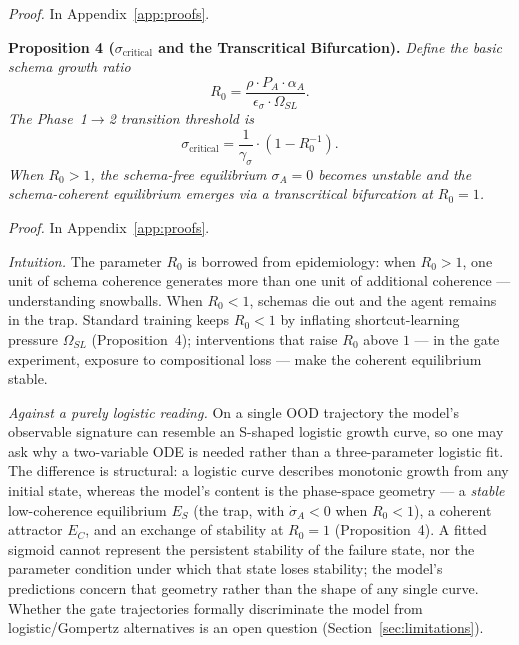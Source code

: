 \documentclass{article}
\theoremstyle{definition}
\begin{document}
\emph{Proof.} In Appendix~\ref{app:proofs}.

\textbf{Proposition 4 ($\sigma_{\text{critical}}$ and the Transcritical
Bifurcation).}
\emph{Define the basic schema growth ratio
\begin{equation}
R_0 = \frac{\rho \cdot P_A \cdot \alpha_A}{\epsilon_\sigma \cdot \Omega_{SL}}.
\end{equation}
The Phase~1$\to$2 transition threshold is
\begin{equation}\label{eq:sigma-critical}
\sigma_{\text{critical}} = \frac{1}{\gamma_\sigma} \cdot \left(1 - R_0^{-1}\right).
\end{equation}
When $R_0 > 1$, the schema-free equilibrium $\sigma_A = 0$ becomes
unstable and the schema-coherent equilibrium emerges via a
\emph{transcritical} bifurcation at $R_0 = 1$.}

\emph{Proof.} In Appendix~\ref{app:proofs}.

\noindent\emph{Intuition.} The parameter $R_0$ is borrowed from
epidemiology: when $R_0 > 1$, one unit of schema coherence generates more
than one unit of additional coherence --- understanding snowballs. When
$R_0 < 1$, schemas die out and the agent remains in the trap. Standard
training keeps $R_0 < 1$ by inflating shortcut-learning pressure
$\Omega_{SL}$ (Proposition~4); interventions
that raise $R_0$ above $1$ --- in the gate experiment, exposure to
compositional loss --- make the coherent equilibrium stable.

\noindent\emph{Against a purely logistic reading.} On a single OOD
trajectory the model's observable signature can resemble an S-shaped
logistic growth curve, so one may ask why a two-variable ODE is needed
rather than a three-parameter logistic fit. The difference is
structural: a logistic curve describes monotonic growth from any
initial state, whereas the model's content is the phase-space geometry
--- a \emph{stable} low-coherence equilibrium $E_S$ (the trap, with
$\dot{\sigma}_A < 0$ when $R_0 < 1$), a coherent attractor $E_C$, and
an exchange of stability at $R_0 = 1$ (Proposition~4). A fitted sigmoid
cannot represent the persistent stability of the failure state, nor the
parameter condition under which that state loses stability; the model's
predictions concern that geometry rather than the shape of any single
curve. Whether the gate trajectories formally discriminate the model
from logistic/Gompertz alternatives is an open question
(Section~\ref{sec:limitations}).
\end{document}
